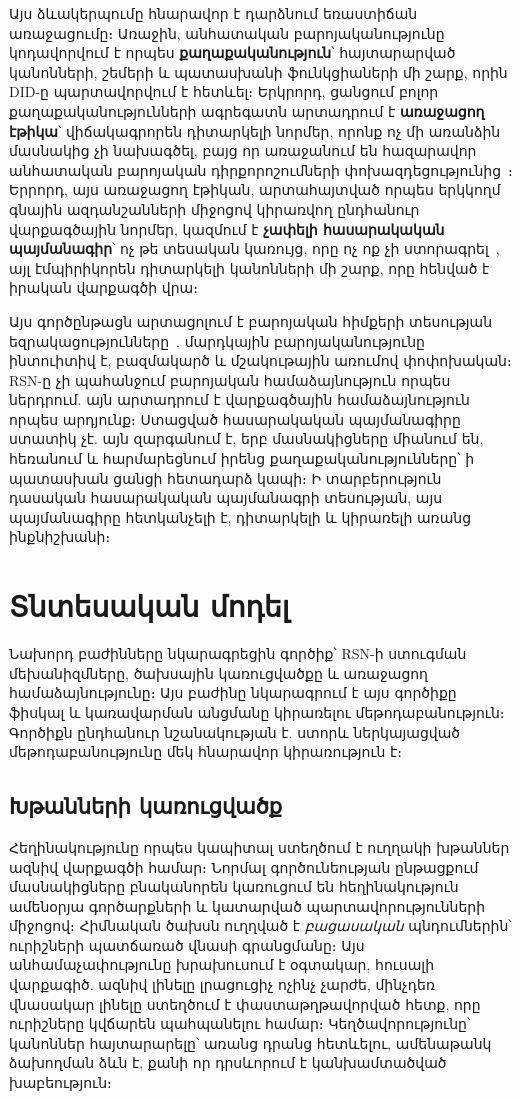 \documentclass[11pt,a4paper,twocolumn]{article}
\begin{document}
Այս ձևակերպումը հնարավոր է դարձնում եռաստիճան առաջացումը։ Առաջին, անհատական բարոյականությունը կոդավորվում է որպես \textbf{քաղաքականություն}՝ հայտարարված կանոնների, շեմերի և պատասխանի ֆունկցիաների մի շարք, որին DID-ը պարտավորվում է հետևել։ Երկրորդ, ցանցում բոլոր քաղաքականությունների ագրեգատն արտադրում է \textbf{առաջացող էթիկա}՝ վիճակագրորեն դիտարկելի նորմեր, որոնք ոչ մի առանձին մասնակից չի նախագծել, բայց որ առաջանում են հազարավոր անհատական բարոյական դիրքորոշումների փոխազդեցությունից~\cite{durkheim1893}։ Երրորդ, այս առաջացող էթիկան, արտահայտված որպես երկկողմ գնային ազդանշանների միջոցով կիրառվող ընդհանուր վարքագծային նորմեր, կազմում է \textbf{չափելի հասարակական պայմանագիր}՝ ոչ թե տեսական կառույց, որը ոչ ոք չի ստորագրել~\cite{rawls1971}, այլ էմպիրիկորեն դիտարկելի կանոնների մի շարք, որը հենված է իրական վարքագծի վրա։

Այս գործընթացն արտացոլում է բարոյական հիմքերի տեսության եզրակացությունները~\cite{haidt2012}. մարդկային բարոյականությունը ինտուիտիվ է, բազմակարծ և մշակութային առումով փոփոխական։ RSN-ը չի պահանջում բարոյական համաձայնություն որպես ներդրում. այն արտադրում է վարքագծային համաձայնություն որպես արդյունք։ Ստացված հասարակական պայմանագիրը ստատիկ չէ. այն զարգանում է, երբ մասնակիցները միանում են, հեռանում և հարմարեցնում իրենց քաղաքականությունները՝ ի պատասխան ցանցի հետադարձ կապի։ Ի տարբերություն դասական հասարակական պայմանագրի տեսության, այս պայմանագիրը հետկանչելի է, դիտարկելի և կիրառելի առանց ինքնիշխանի։

\section{Տնտեսական մոդել}

Նախորդ բաժինները նկարագրեցին գործիք՝ RSN-ի ստուգման մեխանիզմները, ծախսային կառուցվածքը և առաջացող համաձայնությունը։ Այս բաժինը նկարագրում է այս գործիքը ֆիսկալ և կառավարման անցմանը կիրառելու մեթոդաբանություն։ Գործիքն ընդհանուր նշանակության է. ստորև ներկայացված մեթոդաբանությունը մեկ հնարավոր կիրառություն է։

\subsection{Խթանների կառուցվածք}

Հեղինակությունը որպես կապիտալ ստեղծում է ուղղակի խթաններ ազնիվ վարքագծի համար։ Նորմալ գործունեության ընթացքում մասնակիցները բնականորեն կառուցում են հեղինակություն ամենօրյա գործարքների և կատարված պարտավորությունների միջոցով։ Հիմնական ծախսն ուղղված է \emph{բացասական} պնդումներին՝ ուրիշների պատճառած վնասի գրանցմանը։ Այս անհամաչափությունը խրախուսում է օգտակար, հուսալի վարքագիծ. ազնիվ լինելը լրացուցիչ ոչինչ չարժե, մինչդեռ վնասակար լինելը ստեղծում է փաստաթղթավորված հետք, որը ուրիշները կվճարեն պահպանելու համար։ Կեղծավորությունը՝ կանոններ հայտարարելը՝ առանց դրանց հետևելու, ամենաթանկ ձախողման ձևն է, քանի որ դրսևորում է կանխամտածված խաբեություն։
\end{document}
